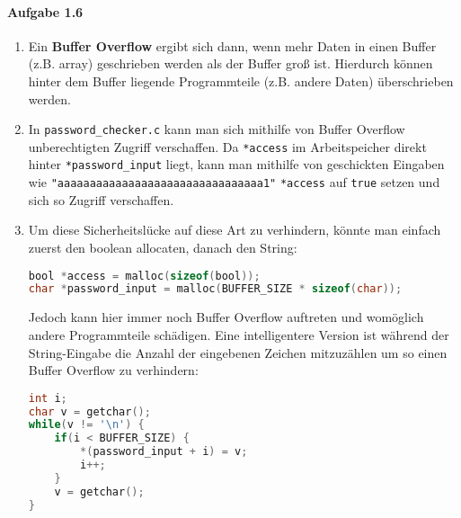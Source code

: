 \documentclass[11pt]{article}
\begin{document}
\paragraph{Aufgabe 1.6}
\begin{enumerate}[label=\alph*)]
\item Ein \textbf{Buffer Overflow} ergibt sich dann, wenn mehr Daten in einen Buffer (z.B. array) geschrieben werden als der Buffer groß ist. Hierdurch können hinter dem Buffer liegende Programmteile (z.B. andere Daten) überschrieben werden.

\item In \verb|password_checker.c| kann man sich mithilfe von Buffer Overflow unberechtigten Zugriff verschaffen. Da \verb|*access| im Arbeitspeicher direkt hinter \verb|*password_input| liegt, kann man mithilfe von geschickten Eingaben wie \verb|"aaaaaaaaaaaaaaaaaaaaaaaaaaaaaaaa1"| \verb|*access| auf \verb|true| setzen und sich so Zugriff verschaffen.

\item Um diese Sicherheitslücke auf diese Art zu verhindern, könnte man einfach zuerst den boolean allocaten, danach den String:
\begin{lstlisting}[language=C]
bool *access = malloc(sizeof(bool));
char *password_input = malloc(BUFFER_SIZE * sizeof(char));
\end{lstlisting}
Jedoch kann hier immer noch Buffer Overflow auftreten und womöglich andere Programmteile schädigen. Eine intelligentere Version ist während der String-Eingabe die Anzahl der eingebenen Zeichen mitzuzählen um so einen Buffer Overflow zu verhindern:
\begin{lstlisting}[language=C]
int i;
char v = getchar();
while(v != '\n') {
	if(i < BUFFER_SIZE) {
		*(password_input + i) = v;
		i++;
	}
	v = getchar();
}
\end{lstlisting}
\end{enumerate}
\end{document}
